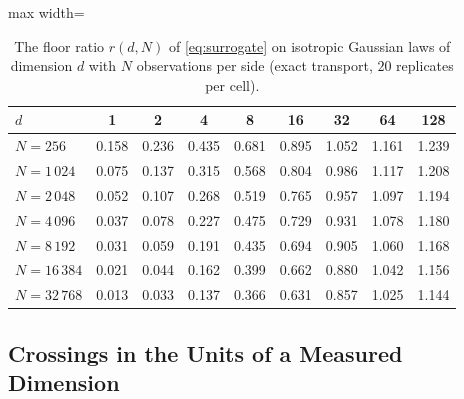 \documentclass[twoside,11pt]{article}
\theoremstyle{plain}
\theoremstyle{definition}
\theoremstyle{remark}
\begin{document}
\begin{table}[htbp]
\centering
\small
\begin{adjustbox}{max width=\textwidth}
\begin{tabular}{lcccccccc}
\toprule
$d$ & 1 & 2 & 4 & 8 & 16 & 32 & 64 & 128 \\
\midrule
$N = 256$ & 0.158 & 0.236 & 0.435 & 0.681 & 0.895 & 1.052 & 1.161 & 1.239 \\
$N = 1\,024$ & 0.075 & 0.137 & 0.315 & 0.568 & 0.804 & 0.986 & 1.117 & 1.208 \\
$N = 2\,048$ & 0.052 & 0.107 & 0.268 & 0.519 & 0.765 & 0.957 & 1.097 & 1.194 \\
$N = 4\,096$ & 0.037 & 0.078 & 0.227 & 0.475 & 0.729 & 0.931 & 1.078 & 1.180 \\
$N = 8\,192$ & 0.031 & 0.059 & 0.191 & 0.435 & 0.694 & 0.905 & 1.060 & 1.168 \\
$N = 16\,384$ & 0.021 & 0.044 & 0.162 & 0.399 & 0.662 & 0.880 & 1.042 & 1.156 \\
$N = 32\,768$ & 0.013 & 0.033 & 0.137 & 0.366 & 0.631 & 0.857 & 1.025 & 1.144 \\
\bottomrule
\end{tabular}
\end{adjustbox}
\caption{The floor ratio $r(d, N)$ of \cref{eq:surrogate} on isotropic
Gaussian laws of dimension $d$ with $N$ observations per side (exact
transport, $20$ replicates per cell).}\label{tab:rsurface}
\end{table}

\subsection{Crossings in the Units of a Measured Dimension}\label{sec:cert-crossings}
\end{document}
